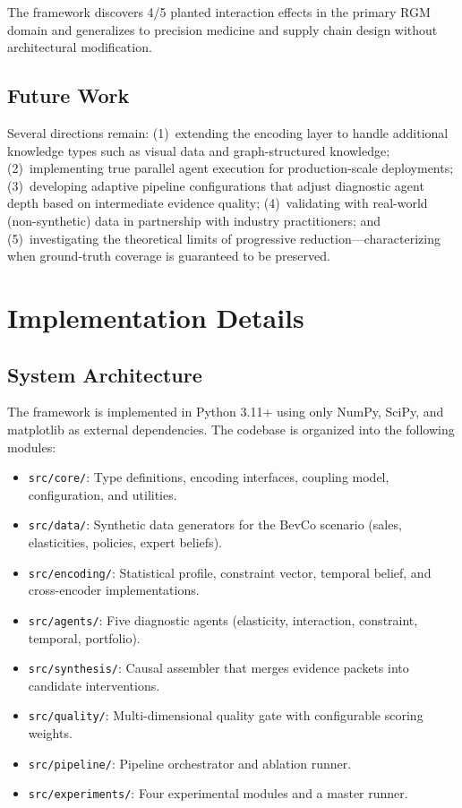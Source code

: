 \documentclass[11pt,a4paper]{article}
\begin{document}
The framework discovers 4/5 planted interaction effects in the primary RGM domain and generalizes to precision medicine and supply chain design without architectural modification.

\subsection{Future Work}

Several directions remain:
(1)~extending the encoding layer to handle additional knowledge types such as visual data and graph-structured knowledge;
(2)~implementing true parallel agent execution for production-scale deployments;
(3)~developing adaptive pipeline configurations that adjust diagnostic agent depth based on intermediate evidence quality;
(4)~validating with real-world (non-synthetic) data in partnership with industry practitioners;
and (5)~investigating the theoretical limits of progressive reduction---characterizing when ground-truth coverage is guaranteed to be preserved.





\appendix
\section{Implementation Details}
\label{app:implementation}

\subsection{System Architecture}

The framework is implemented in Python 3.11+ using only NumPy, SciPy, and matplotlib as external dependencies.
The codebase is organized into the following modules:

\begin{itemize}
    \item \texttt{src/core/}: Type definitions, encoding interfaces, coupling model, configuration, and utilities.
    \item \texttt{src/data/}: Synthetic data generators for the BevCo scenario (sales, elasticities, policies, expert beliefs).
    \item \texttt{src/encoding/}: Statistical profile, constraint vector, temporal belief, and cross-encoder implementations.
    \item \texttt{src/agents/}: Five diagnostic agents (elasticity, interaction, constraint, temporal, portfolio).
    \item \texttt{src/synthesis/}: Causal assembler that merges evidence packets into candidate interventions.
    \item \texttt{src/quality/}: Multi-dimensional quality gate with configurable scoring weights.
    \item \texttt{src/pipeline/}: Pipeline orchestrator and ablation runner.
    \item \texttt{src/experiments/}: Four experimental modules and a master runner.
\end{itemize}
\end{document}
